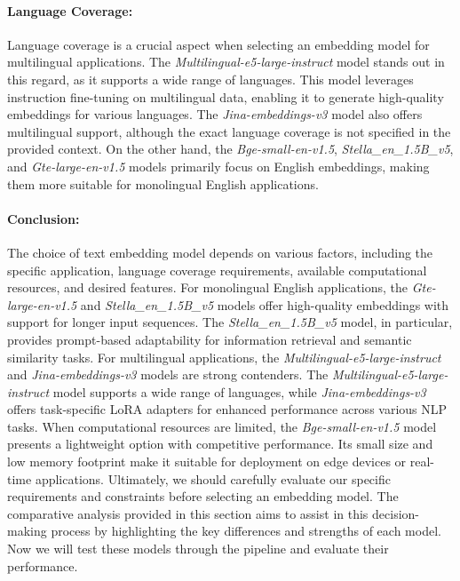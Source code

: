 \paragraph{Language Coverage:}
Language coverage is a crucial aspect when selecting an embedding model for multilingual applications. The \textit{Multilingual-e5-large-instruct} model stands out in this regard, as it supports a wide range of languages.
This model leverages instruction fine-tuning on multilingual data, enabling it to generate high-quality embeddings for various languages.
The \textit{Jina-embeddings-v3} model also offers multilingual support, although the exact language coverage is not specified in the provided context. On the other hand, the \textit{Bge-small-en-v1.5}, \textit{Stella\_en\_1.5B\_v5}, and \textit{Gte-large-en-v1.5} models primarily focus on English embeddings, making them more suitable for monolingual English applications.
\paragraph{Conclusion:}
The choice of text embedding model depends on various factors, including the specific application, language coverage requirements, available computational resources, and desired features. For monolingual English applications, the \textit{Gte-large-en-v1.5} and \textit{Stella\_en\_1.5B\_v5} models offer high-quality embeddings with support for longer input sequences.
The \textit{Stella\_en\_1.5B\_v5} model, in particular, provides prompt-based adaptability for information retrieval and semantic similarity tasks.
For multilingual applications, the \textit{Multilingual-e5-large-instruct} and \textit{Jina-embeddings-v3} models are strong contenders.
The \textit{Multilingual-e5-large-instruct} model supports a wide range of languages, while \textit{Jina-embeddings-v3} offers task-specific LoRA adapters for enhanced performance across various NLP tasks.
When computational resources are limited, the \textit{Bge-small-en-v1.5} model presents a lightweight option with competitive performance.
Its small size and low memory footprint make it suitable for deployment on edge devices or real-time applications.
Ultimately, we should carefully evaluate our specific requirements and constraints before selecting an embedding model.
The comparative analysis provided in this section aims to assist in this decision-making process by highlighting the key differences and strengths of each model.
Now we will test these models through the pipeline and evaluate their performance.

